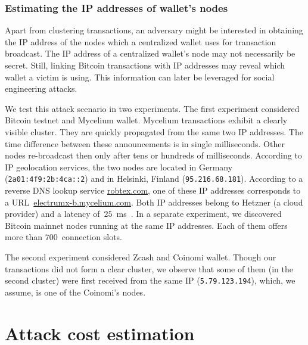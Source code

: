 \subsubsection*{Estimating the IP addresses of wallet's nodes}

Apart from clustering transactions, an adversary might be interested in obtaining the IP address of the nodes which a centralized wallet uses for transaction broadcast.
The IP address of a centralized wallet's node may not necessarily be secret.
Still, linking Bitcoin transactions with IP addresses may reveal which wallet a victim is using.
This information can later be leveraged for social engineering attacks.

We test this attack scenario in two experiments.
The first experiment considered Bitcoin testnet and Mycelium wallet.
Mycelium transactions exhibit a clearly visible cluster.
They are quickly propagated from the same two IP addresses.
The time difference between these announcements is in single milliseconds.
Other nodes re-broadcast then only after tens or hundreds of milliseconds.
According to IP geolocation services, the two nodes are located in Germany (\texttt{2a01:4f9:2b:4ca::2}) and in Helsinki, Finland (\texttt{95.216.68.181}).
According to a reverse DNS lookup service \url{robtex.com}, one of these IP addresses corresponds to a URL~\url{electrumx-b.mycelium.com}.
Both IP addresses belong to Hetzner (a cloud provider) and a latency of~$25$~ms~\cite{Bitnodes}.
In a separate experiment, we discovered Bitcoin mainnet nodes running at the same IP addresses.
Each of them offers more than $700$~connection slots.

The second experiment considered Zcash and Coinomi wallet.
Though our transactions did not form a clear cluster, we observe that some of them (in the second cluster) were first received from the same IP (\texttt{5.79.123.194}), which, we assume, is one of the Coinomi's nodes.


\section{Attack cost estimation}

